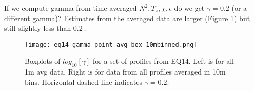 \documentclass[11pt]{article}
\begin{document}
If we compute gamma from time-averaged $N^2,T_z,\chi,\epsilon$ do we get $\gamma=0.2$ (or a different gamma)? Estimates from the averaged data are larger (Figure \ref{gambox_eq14}) but still slightly less than 0.2 .

\begin{figure}[htbp]
\texttt{[image: eq14\_gamma\_point\_avg\_box\_10mbinned.png]}
\caption{Boxplots of $log_{10}[\gamma]$ for a set of profiles from EQ14. Left is for all 1m avg data. Right is for data from all profiles averaged in 10m bins. Horizontal dashed line indicates $\gamma=0.2$.}
\label{gambox_eq14}
\end{figure}








\end{document}
